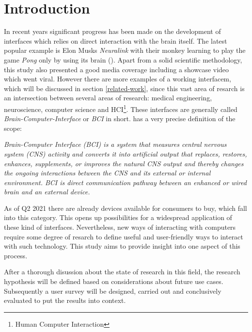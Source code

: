     \chapter{Introduction}\label{introduction}

        In recent years significant progress has been made on the development of interfaces which relies on direct interaction with the brain itself. The latest popular example is Elon Musks \textit{Neuralink} with their monkey learning to play the game \textit{Pong} only by using its brain (\cite{Neuralink.2021}). Apart from a solid scientific methodology, this study also presented a good media coverage including a showcase video which went viral. However there are more examples of a working interfacem, which will be discussed in section \ref*{related-work}, since this vast area of resarch is an intersection between several areas of research: medical engineering, neuroscience, computer science and HCI\footnote{Human Computer Interaction}.
        These interfaces are generally called \textit{Brain-Computer-Interface} or \textit{BCI} in short. \cite{MicrosoftResearch.23102020} has a very precise definition of the scope:

        \medskip
            \emph{Brain-Computer Interface (BCI) is a system that measures central nervous system (CNS) activity and converts it into artificial output that replaces, restores, enhances, supplements, or improves the natural CNS output and thereby changes the ongoing interactions between the CNS and its external or internal environment. BCI is direct communication pathway between an enhanced or wired brain and an external device.}
        \medskip

        As of Q2 2021 there are already devices available for consumers to buy, which fall into this category. This opens up possibilities for a widespread application of these kind of interfaces. Nevertheless, new ways of interacting with computers require some degree of resarch to define useful and user-friendly ways to interact with such technology. This study aims to provide insight into one aspect of this process.

        After a thorough disussion about the state of research in this field, the research hypothesis will be defined based on considerations about future use cases. Subsequently a user survey will be designed, carried out and conclusively evaluated to put the results into context.

        \clearpage\thispagestyle{empty}
        
